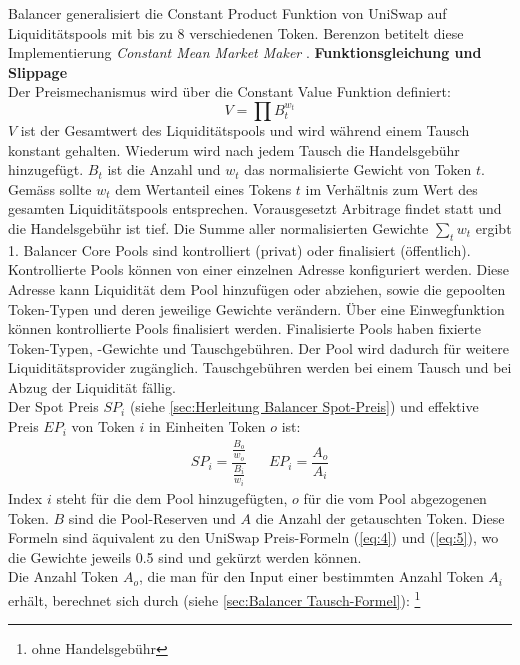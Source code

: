 \documentclass[12pt,a4paper,titlepage,oneside,english]{article}
\begin{document}
Balancer generalisiert die Constant Product Funktion von UniSwap auf Liquiditätspools mit bis zu 8 verschiedenen Token. Berenzon betitelt diese Implementierung \textit{Constant Mean Market Maker} \citep{Berenzon2020}.
\newpage
\textbf{Funktionsgleichung und Slippage}\\
Der Preismechanismus wird über die Constant Value Funktion definiert: \citep{MartinelliMushegian2019} 
\begin{equation}
V = \prod B^{w_{t}}_{t} \label{eq:10}
\end{equation}
$V$ ist der Gesamtwert des Liquiditätspools und wird während einem Tausch konstant gehalten. Wiederum wird nach jedem Tausch die Handelsgebühr hinzugefügt. $B_{t}$ ist die Anzahl und $w_{t}$ das normalisierte Gewicht von Token $t$. \\ 
Gemäss \citet{MartinelliMushegian2019} sollte $w_{t}$ dem Wertanteil eines Tokens $t$ im Verhältnis zum Wert des gesamten Liquiditätspools entsprechen. Vorausgesetzt Arbitrage findet statt und die Handelsgebühr ist tief. Die Summe aller normalisierten Gewichte $ \sum_{t} w_{t}$ ergibt 1. 
Balancer Core Pools sind kontrolliert (privat) oder finalisiert (öffentlich). Kontrollierte Pools können von einer einzelnen Adresse konfiguriert werden. Diese Adresse kann Liquidität dem Pool hinzufügen oder abziehen, sowie die gepoolten Token-Typen und deren jeweilige Gewichte verändern. Über eine Einwegfunktion können kontrollierte Pools finalisiert werden. Finalisierte Pools haben fixierte Token-Typen, -Gewichte und Tauschgebühren. Der Pool wird dadurch für weitere Liquiditätsprovider zugänglich. Tauschgebühren werden bei einem Tausch und bei Abzug der Liquidität fällig. \citep{MartinelliMushegian2019} \\
Der Spot Preis $SP_{i}$ (siehe \ref{sec:Herleitung Balancer Spot-Preis}) und effektive Preis $EP_{i}$ von Token $i$ in Einheiten Token $o$ ist: \citep{MartinelliMushegian2019}
\begin{align}
SP_{i} = \dfrac{\frac{B_{o}}{w_{o}}}{\frac{B_{i}}{w_{i}}}   && EP_{i}=\dfrac{A_{o}}{A_{i}}\label{eq:11} 
\end{align} %
Index $i$ steht für die dem Pool hinzugefügten, $o$ für die vom Pool abgezogenen Token. $B$ sind die Pool-Reserven und $A$ die Anzahl der getauschten Token. Diese Formeln sind äquivalent zu den UniSwap Preis-Formeln (\ref{eq:4}) und (\ref{eq:5}), wo die Gewichte jeweils 0.5 sind und gekürzt werden können.\\
Die Anzahl Token $A_{o}$, die man für den Input einer bestimmten Anzahl Token $A_{i}$ erhält, berechnet sich durch (siehe \ref{sec:Balancer Tausch-Formel}): \footnote{ohne Handelsgebühr} \citep{MartinelliMushegian2019}
\end{document}
